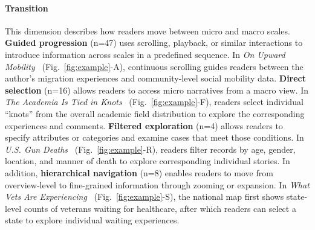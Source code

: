 \paragraph{\textbf{\textcolor{imp}{Transition}}}

This dimension describes how readers move between micro and macro scales. \textbf{Guided progression} (n=47) uses scrolling, playback, or similar interactions to introduce information across scales in a predefined sequence. In \textit{On Upward Mobility}~\cite{williams2022upwardmobility} (Fig.~\ref{fig:example}-A), continuous scrolling guides readers between the author’s migration experiences and community-level social mobility data. \textbf{Direct selection} (n=16) allows readers to access micro narratives from a macro view. In \textit{The Academia Is Tied in Knots}~\cite{tiedinknots} (Fig.~\ref{fig:example}-F), readers select individual “knots” from the overall academic field distribution to explore the corresponding experiences and comments. \textbf{Filtered exploration} (n=4) allows readers to specify attributes or categories and examine cases that meet those conditions. In \textit{U.S. Gun Deaths}~\cite{periscopic2013gundeaths} (Fig.~\ref{fig:example}-R), readers filter records by age, gender, location, and manner of death to explore corresponding individual stories. In addition, \textbf{hierarchical navigation} (n=8) enables readers to move from overview-level to fine-grained information through zooming or expansion. In \textit{What Vets Are Experiencing}~\cite{periscopicwaitwecarry} (Fig.~\ref{fig:example}-S), the national map first shows state-level counts of veterans waiting for healthcare, after which readers can select a state to explore individual waiting experiences.
